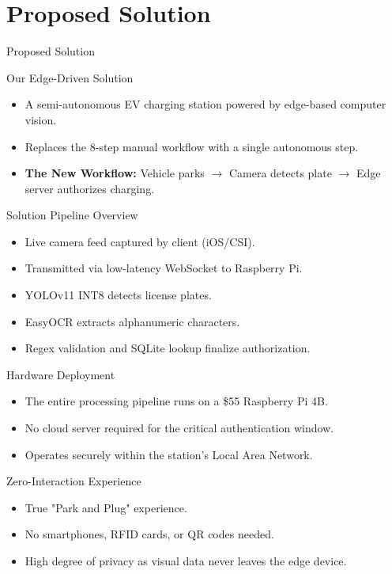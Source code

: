 \documentclass{beamer}
\begin{document}
\section{Proposed Solution}

\begin{frame}
    \centering
    \Huge Proposed Solution
\end{frame}

\begin{frame}{Our Edge-Driven Solution}
\begin{itemize}
    \item A semi-autonomous EV charging station powered by edge-based computer vision.
    \item Replaces the 8-step manual workflow with a single autonomous step.
    \item \textbf{The New Workflow:} Vehicle parks $\to$ Camera detects plate $\to$ Edge server authorizes charging.
\end{itemize}
\end{frame}

\begin{frame}{Solution Pipeline Overview}
\begin{itemize}
    \item Live camera feed captured by client (iOS/CSI).
    \item Transmitted via low-latency WebSocket to Raspberry Pi.
    \item YOLOv11 INT8 detects license plates.
    \item EasyOCR extracts alphanumeric characters.
    \item Regex validation and SQLite lookup finalize authorization.
\end{itemize}
\end{frame}

\begin{frame}{Hardware Deployment}
\begin{itemize}
    \item The entire processing pipeline runs on a \$55 Raspberry Pi 4B.
    \item No cloud server required for the critical authentication window.
    \item Operates securely within the station's Local Area Network.
\end{itemize}
\end{frame}

\begin{frame}{Zero-Interaction Experience}
\begin{itemize}
    \item True "Park and Plug" experience.
    \item No smartphones, RFID cards, or QR codes needed.
    \item High degree of privacy as visual data never leaves the edge device.
\end{itemize}
\end{frame}
\end{document}
